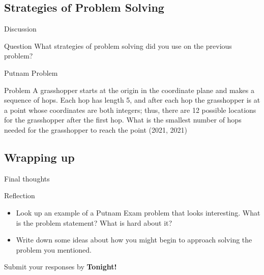 \documentclass{beamer}
\begin{document}
\subsection{Strategies of Problem Solving}

\begin{frame}{Discussion}
  \begin{block}{Question}
    What strategies of problem solving did you use on the previous problem?
  \end{block}
\end{frame}

\begin{frame}{Putnam Problem}
  \begin{block}{Problem}
A grasshopper starts at the origin in the coordinate plane and makes a sequence of
hops. Each hop has length 5, and after each hop the grasshopper is at a point whose
coordinates are both integers; thus, there are 12 possible locations for the grasshopper
after the first hop. What is the smallest number of hops needed for the grasshopper
to reach the point (2021, 2021)
  \end{block}
\end{frame}

\subsection{Wrapping up}

\begin{frame}{Final thoughts}
  \begin{block}{Reflection}
    \begin{itemize}
\pause
      \item Look up an example of a Putnam Exam problem that looks interesting.  What is the problem statement?  What is hard about it?
\pause
      \item Write down some ideas about how you might begin to approach solving the problem you mentioned.
    \end{itemize}
  \end{block}
\begin{center}
Submit your responses by \textbf{Tonight!}
\end{center}
\end{frame}
\end{document}
